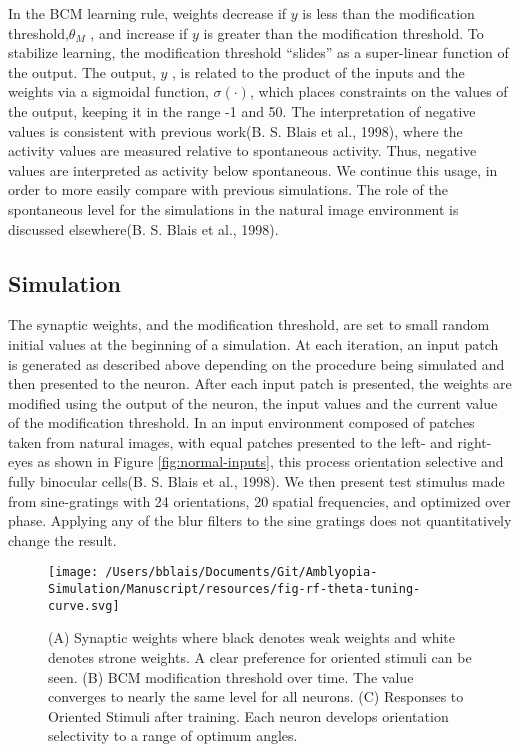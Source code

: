 \documentclass[
  onecolumn]{article}
\begin{document}
In the BCM learning rule, weights decrease if \(y\) is less than the
modification threshold,\(\theta_M\) , and increase if \(y\) is greater
than the modification threshold. To stabilize learning, the modification
threshold ``slides'' as a super-linear function of the output. The
output, \(y\) , is related to the product of the inputs and the weights
via a sigmoidal function, \(\sigma(\cdot)\), which places constraints on
the values of the output, keeping it in the range -1 and 50. The
interpretation of negative values is consistent with previous work(B. S.
Blais et al., 1998), where the activity values are measured relative to
spontaneous activity. Thus, negative values are interpreted as activity
below spontaneous. We continue this usage, in order to more easily
compare with previous simulations. The role of the spontaneous level for
the simulations in the natural image environment is discussed
elsewhere(B. S. Blais et al., 1998).

\hypertarget{simulation}{%
\subsection{Simulation}\label{simulation}}

The synaptic weights, and the modification threshold, are set to small
random initial values at the beginning of a simulation. At each
iteration, an input patch is generated as described above depending on
the procedure being simulated and then presented to the neuron. After
each input patch is presented, the weights are modified using the output
of the neuron, the input values and the current value of the
modification threshold. In an input environment composed of patches
taken from natural images, with equal patches presented to the left- and
right-eyes as shown in Figure \ref{fig:normal-inputs}, this process
orientation selective and fully binocular cells(B. S. Blais et al.,
1998). We then present test stimulus made from sine-gratings with 24
orientations, 20 spatial frequencies, and optimized over phase. Applying
any of the blur filters to the sine gratings does not quantitatively
change the result.

\begin{figure}
\hypertarget{fig:rf-theta-tuning-curve}{%
\centering
\texttt{[image: /Users/bblais/Documents/Git/Amblyopia-Simulation/Manuscript/resources/fig-rf-theta-tuning-curve.svg]}
\caption{(A) Synaptic weights where black denotes weak weights and white
denotes strone weights. A clear preference for oriented stimuli can be
seen. (B) BCM modification threshold over time. The value converges to
nearly the same level for all neurons. (C) Responses to Oriented Stimuli
after training. Each neuron develops orientation selectivity to a range
of optimum angles.}\label{fig:rf-theta-tuning-curve}
}
\end{figure}
\end{document}
